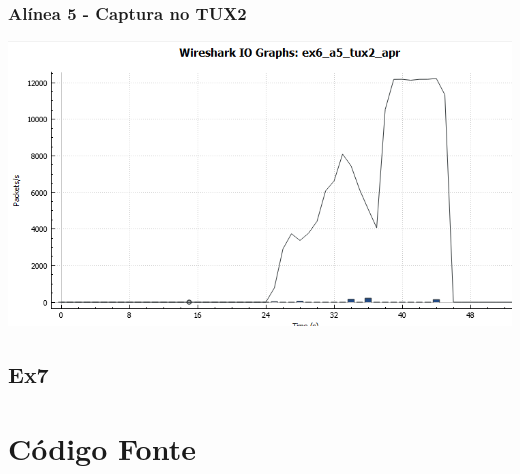 \documentclass[11pt,a4paper,reqno]{report}
\numberwithin{equation}{section}
\begin{document}
\begin{appendices}
\subsection{Alínea 5 - Captura no TUX2}
\label{ex6_a5_2io}
\includegraphics[width=18cm]{ex6_a5_tux2_IO.png}

\section{Ex7}

\chapter{Código Fonte}






\pagebreak


\end{appendices}
\end{document}
